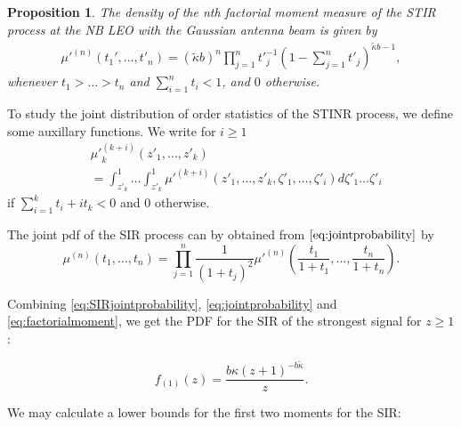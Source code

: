 \documentclass[lettersize,journal]{IEEEtran}
\newtheorem{prop}[theorem]{Proposition}
\begin{document}
\begin{prop}
  The density of the nth factorial moment measure of the STIR process at the NB LEO with the Gaussian antenna beam is given by
  \begin{align}
    \label{eq:factorialmoment}
    \mu'^{(n)}(t_1',\dots,t'_n) = (\tilde{\kappa}b)^n\prod_{j=1}^n{t'}_{j}^{-1}\left(1- \sum_{j=1}^nt'_j \right)^{\tilde{\kappa}b-1},       
  \end{align}
  whenever $t_1>\dots >t_n$ and $\sum_{i=1}^n t_i <1$, and $0$ otherwise.
\end{prop}
To study the joint distribution of order statistics of the STINR process, we define some auxillary functions. We write for $i\geq 1$
\begin{align}
  \label{eq:auxillary}
  &{\mu'}_k^{(k+i)}(z'_1,\dots,z'_k) \nonumber \\
  &= \int_{z'_k}^1 \dots \int_{z'_k}^1 {\mu'}^{(k+i)}(z'_1,\dots,z'_k,\zeta'_1,\dots,\zeta'_i) d\zeta'_1 \dots \zeta'_i
\end{align}
if $\sum_{i=1}^k t_i + it_k <0$ and $0$ otherwise. 

The joint pdf of the SIR process can by obtained from $\eqref{eq:jointprobability}$ by
\begin{equation}
  \label{eq:SIRjointprobability}
  \mu^{(n)}(t_1,\dots,t_n) = \prod_{j=1}^n\frac{1}{(1+t_j)^2}\mu'^{(n)}\left(\frac{t_1}{1+t_1},\dots,\frac{t_n}{1+t_n}\right).
\end{equation}



Combining \eqref{eq:SIRjointprobability}, \eqref{eq:jointprobability} and \eqref{eq:factorialmoment}, we get the PDF for the SIR of the strongest signal for $z\geq 1$:



\begin{equation}
  f_{(1)}(z) = \frac {b\kappa\left({z + 1} \right)^{-b\tilde{\kappa}}} {z}.
\end{equation}


We may calculate a lower bounds for the first two moments for the SIR:
\end{document}
